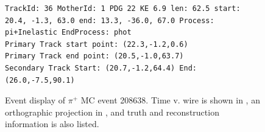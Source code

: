 \documentclass[letterpaper,12pt]{article}
\newcommand{\pip}{\ensuremath{\pi^{+}}}
\begin{document}
\begin{figure}[!hbtp]
\begin{center}
\begin{lstlisting}
TrackId: 36 MotherId: 1 PDG 22 KE 6.9 len: 62.5 start: 20.4, -1.3, 63.0 end: 13.3, -36.0, 67.0 Process: pi+Inelastic EndProcess: phot
Primary Track start point: (22.3,-1.2,0.6)
Primary Track end point: (20.5,-1.0,63.7)
Secondary Track Start: (20.7,-1.2,64.4) End: (26.0,-7.5,90.1)
\end{lstlisting}
    \caption{%
                Event display of \pip{} MC event 208638. 
                Time v. wire is shown in , 
                an orthographic projection in ,
                and truth and reconstruction information is also listed.
            }
    \label{fig:evd_pipMC_208638}
  \end{center}
\end{figure}

\begin{figure}[!hbtp]
  \begin{center}
\end{center}
\end{figure}
\end{document}

